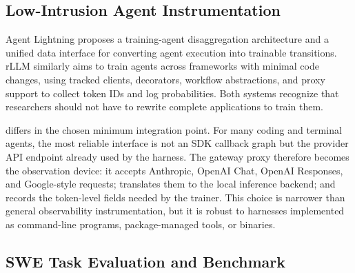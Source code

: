 \subsection{Low-Intrusion Agent Instrumentation}

Agent Lightning \citep{agentlightning2025} proposes a training-agent disaggregation architecture and a unified data interface for converting agent execution into trainable transitions. rLLM \citep{rllm2025} similarly aims to train agents across frameworks with minimal code changes, using tracked clients, decorators, workflow abstractions, and proxy support to collect token IDs and log probabilities. Both systems recognize that researchers should not have to rewrite complete applications to train them.

\polar differs in the chosen minimum integration point. For many coding and terminal agents, the most reliable interface is not an SDK callback graph but the provider API endpoint already used by the harness. The gateway proxy therefore becomes the observation device: it accepts Anthropic, OpenAI Chat, OpenAI Responses, and Google-style requests; translates them to the local inference backend; and records the token-level fields needed by the trainer. This choice is narrower than general observability instrumentation, but it is robust to harnesses implemented as command-line programs, package-managed tools, or binaries.


\subsection{SWE Task Evaluation and Benchmark}

